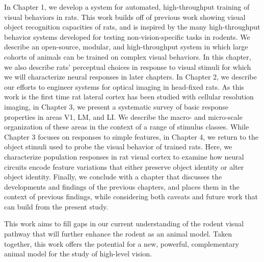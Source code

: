 In Chapter 1, we develop a system for automated, high-throughput training of visual behaviors in rats. This work builds off of previous work showing visual object recognition capacities of rats, and is inspired by the many high-throughput behavior systems developed for testing non-vision-specific tasks in rodents. We describe an open-source, modular, and high-throughput system in which large cohorts of animals can be trained on complex visual behaviors. In this chapter, we also describe rats' perceptual choices in response to visual stimuli for which we will characterize neural responses in later chapters. In Chapter 2, we describe our efforts to engineer systems for optical imaging in head-fixed rats. As this work is the first time rat lateral cortex has been studied with cellular resolution imaging, in Chapter 3, we present a systematic survey of basic response properties in areas V1, LM, and LI. We describe the macro- and micro-scale organization of these areas in the context of a range of stimulus classes. While Chapter 3 focuses on responses to simple features, in Chapter 4, we return to the object stimuli used to probe the visual behavior of trained rats. Here, we characterize population responses in rat visual cortex to examine how neural circuits encode feature variations that either preserve object identity or alter object identity. Finally, we conclude with a chapter that discusses the developments and findings of the previous chapters, and places them in the context of previous findings, while considering both caveats and future work that can build from the present study.

This work aims to fill gaps in our current understanding of the rodent visual pathway that will further enhance the rodent as an animal model. Taken together, this work offers the potential for a new, powerful, complementary animal model for the study of high-level vision.





